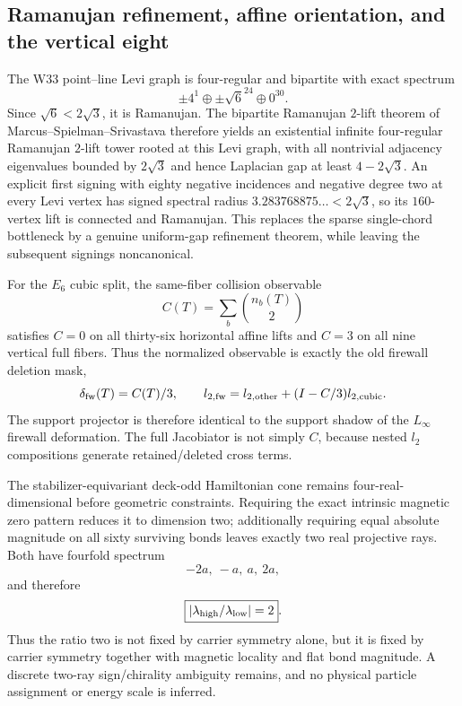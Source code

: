 \subsection{Ramanujan refinement, affine orientation, and the vertical eight}

The W33 point--line Levi graph is four-regular and bipartite with exact spectrum
\[
 \pm4^1\oplus\pm\sqrt6^{24}\oplus0^{30}.
\]
Since $\sqrt6<2\sqrt3$, it is Ramanujan.  The bipartite Ramanujan $2$-lift theorem of Marcus--Spielman--Srivastava therefore yields an existential infinite four-regular Ramanujan $2$-lift tower rooted at this Levi graph, with all nontrivial adjacency eigenvalues bounded by $2\sqrt3$ and hence Laplacian gap at least $4-2\sqrt3$.  An explicit first signing with eighty negative incidences and negative degree two at every Levi vertex has signed spectral radius $3.283768875\ldots<2\sqrt3$, so its $160$-vertex lift is connected and Ramanujan.  This replaces the sparse single-chord bottleneck by a genuine uniform-gap refinement theorem, while leaving the subsequent signings noncanonical.

For the $E_6$ cubic split, the same-fiber collision observable
\[
 C(T)=\sum_b\binom{n_b(T)}2
\]
satisfies $C=0$ on all thirty-six horizontal affine lifts and $C=3$ on all nine vertical full fibers.  Thus the normalized observable is exactly the old firewall deletion mask,
\[
 \delta_{\rm fw}(T)=C(T)/3,
 \qquad
 l_{2,\rm fw}=l_{2,\rm other}+(I-C/3)l_{2,\rm cubic}.
\]
The support projector is therefore identical to the support shadow of the $L_\infty$ firewall deformation.  The full Jacobiator is not simply $C$, because nested $l_2$ compositions generate retained/deleted cross terms.

The stabilizer-equivariant deck-odd Hamiltonian cone remains four-real-dimensional before geometric constraints.  Requiring the exact intrinsic magnetic zero pattern reduces it to dimension two; additionally requiring equal absolute magnitude on all sixty surviving bonds leaves exactly two real projective rays.  Both have fourfold spectrum
\[
 -2a,\ -a,\ a,\ 2a,
\]
and therefore
\[
 \boxed{|\lambda_{\rm high}/\lambda_{\rm low}|=2}.
\]
Thus the ratio two is not fixed by carrier symmetry alone, but it is fixed by carrier symmetry together with magnetic locality and flat bond magnitude.  A discrete two-ray sign/chirality ambiguity remains, and no physical particle assignment or energy scale is inferred.

